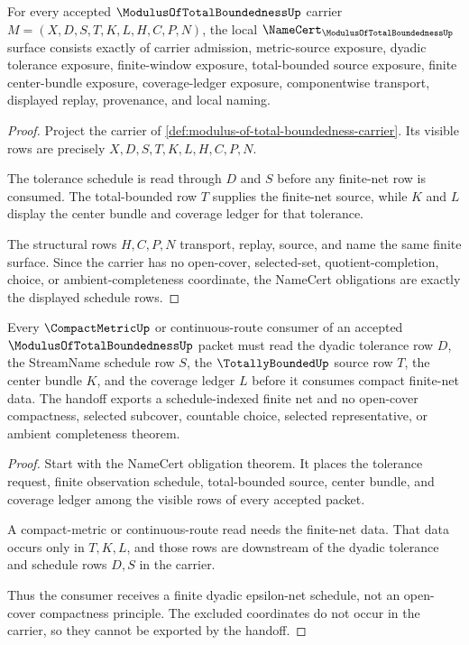 \begin{theorem}
\label{thm:modulus-of-total-boundedness-namecert-obligations}
For every accepted $\ModulusOfTotalBoundednessUp$ carrier $M=(X,D,S,T,K,L,H,C,P,N)$, the local $\NameCert_{\ModulusOfTotalBoundednessUp}$ surface consists exactly of carrier admission, metric-source exposure, dyadic tolerance exposure, finite-window exposure, total-bounded source exposure, finite center-bundle exposure, coverage-ledger exposure, componentwise transport, displayed replay, provenance, and local naming.
\end{theorem}
\begin{proof}
Project the carrier of \autoref{def:modulus-of-total-boundedness-carrier}. Its visible rows are precisely $X,D,S,T,K,L,H,C,P,N$.

The tolerance schedule is read through $D$ and $S$ before any finite-net row is consumed. The total-bounded row $T$ supplies the finite-net source, while $K$ and $L$ display the center bundle and coverage ledger for that tolerance.

The structural rows $H,C,P,N$ transport, replay, source, and name the same finite surface. Since the carrier has no open-cover, selected-set, quotient-completion, choice, or ambient-completeness coordinate, the NameCert obligations are exactly the displayed schedule rows.
\end{proof}

\begin{theorem}
\label{thm:modulus-of-total-boundedness-compact-handoff}
Every $\CompactMetricUp$ or continuous-route consumer of an accepted $\ModulusOfTotalBoundednessUp$ packet must read the dyadic tolerance row $D$, the StreamName schedule row $S$, the $\TotallyBoundedUp$ source row $T$, the center bundle $K$, and the coverage ledger $L$ before it consumes compact finite-net data. The handoff exports a schedule-indexed finite net and no open-cover compactness, selected subcover, countable choice, selected representative, or ambient completeness theorem.
\end{theorem}
\begin{proof}
Start with the NameCert obligation theorem. It places the tolerance request, finite observation schedule, total-bounded source, center bundle, and coverage ledger among the visible rows of every accepted packet.

A compact-metric or continuous-route read needs the finite-net data. That data occurs only in $T,K,L$, and those rows are downstream of the dyadic tolerance and schedule rows $D,S$ in the carrier.

Thus the consumer receives a finite dyadic epsilon-net schedule, not an open-cover compactness principle. The excluded coordinates do not occur in the carrier, so they cannot be exported by the handoff.
\end{proof}

